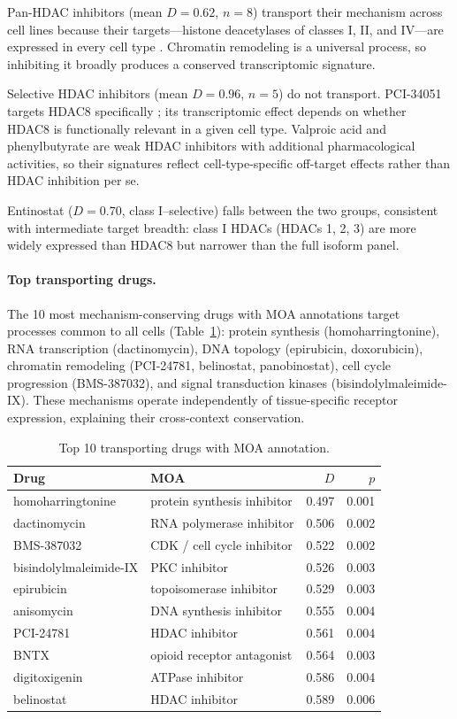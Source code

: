 \documentclass{article}
\begin{document}
Pan-HDAC inhibitors (mean $D = 0.62$, $n = 8$) transport their mechanism
across cell lines because their targets---histone deacetylases of classes
I, II, and IV---are expressed in every cell type
\citep{bolden2006anticancer}. Chromatin remodeling is a universal process,
so inhibiting it broadly produces a conserved transcriptomic signature.

Selective HDAC inhibitors (mean $D = 0.96$, $n = 5$) do not transport.
PCI-34051 targets HDAC8 specifically
\citep{balasubramanian2008hdac8}; its transcriptomic effect depends on
whether HDAC8 is functionally relevant in a given cell type. Valproic acid
and phenylbutyrate are weak HDAC inhibitors with additional pharmacological
activities, so their signatures reflect cell-type-specific off-target
effects rather than HDAC inhibition per se.

Entinostat ($D = 0.70$, class I--selective) falls between the two groups,
consistent with intermediate target breadth: class I HDACs (HDACs 1, 2, 3)
are more widely expressed than HDAC8 but narrower than the full isoform
panel.

\paragraph{Top transporting drugs.}

The 10 most mechanism-conserving drugs with MOA annotations target processes
common to all cells (Table~\ref{tab:top}): protein synthesis
(homoharringtonine), RNA transcription (dactinomycin), DNA topology
(epirubicin, doxorubicin), chromatin remodeling (PCI-24781, belinostat,
panobinostat), cell cycle progression (BMS-387032), and signal transduction
kinases (bisindolylmaleimide-IX). These mechanisms operate independently
of tissue-specific receptor expression, explaining their cross-context
conservation.

\begin{table}[t]
\centering
\caption{Top 10 transporting drugs with MOA annotation.}
\label{tab:top}
\small
\begin{tabular}{llrr}
\toprule
Drug & MOA & $D$ & $p$ \\
\midrule
homoharringtonine & protein synthesis inhibitor & 0.497 & 0.001 \\
dactinomycin & RNA polymerase inhibitor & 0.506 & 0.002 \\
BMS-387032 & CDK / cell cycle inhibitor & 0.522 & 0.002 \\
bisindolylmaleimide-IX & PKC inhibitor & 0.526 & 0.003 \\
epirubicin & topoisomerase inhibitor & 0.529 & 0.003 \\
anisomycin & DNA synthesis inhibitor & 0.555 & 0.004 \\
PCI-24781 & HDAC inhibitor & 0.561 & 0.004 \\
BNTX & opioid receptor antagonist & 0.564 & 0.003 \\
digitoxigenin & ATPase inhibitor & 0.586 & 0.004 \\
belinostat & HDAC inhibitor & 0.589 & 0.006 \\
\bottomrule
\end{tabular}
\end{table}
\end{document}

